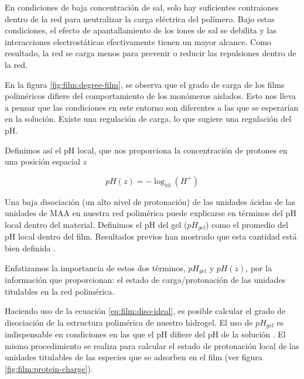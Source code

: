 En condiciones de baja concentraci\'on de sal, solo hay suficientes contraiones dentro de la red para neutralizar la carga el\'ectrica del pol\'imero. Bajo estas condiciones, el efecto de apantallamiento de los iones de sal se debilita y las interacciones electrost\'aticas efectivamente tienen un mayor alcance. Como resultado, la red se carga menos para prevenir o reducir las repulsiones dentro de la red.

En la figura \ref{fig:film:degree-film}, se observa que el grado de carga de los films polim\'ericos difiere del comportamiento de los mon\'omeros aislados. Esto nos lleva a pensar que las condiciones en este entorno son diferentes a las que se esperar\'ian en la soluci\'on. Existe una regulaci\'on de carga, lo que sugiere una regulaci\'on del pH.

Definimos as\'i el pH local, que nos proporciona la concentración de protones en una posición espacial $z$

\begin{equation}
	pH(z) = -\log_{10}(H^+)
	\label{eq:film:pH-local}
\end{equation}

Una baja disociaci\'on (un alto nivel de protonaci\'on) de las unidades \'acidas de las unidades de MAA en nuestra red polim\'erica puede explicarse en t\'erminos del pH local dentro del material. Definimos el pH del gel ($pH_{gel}$) como el promedio del pH local dentro del film. Resultados previos han mostrado que esta cantidad est\'a bien definida \addcite.

Enfatizamos la importancia de estos dos t\'erminos, $pH_{gel}$ y $pH(z)$, por la informaci\'on que proporcionan: el estado de carga/protonaci\'on de las unidades titulables en la red polim\'erica.

Haciendo uso de la ecuaci\'on \ref{eq:film:diso-ideal}, es posible calcular el grado de disociaci\'on de la estructura polim\'erica de nuestro hidrogel. El uso de $pH_{gel}$ es indispensable en condiciones en las que el pH difiere del pH de la soluci\'on \addcite. El mismo procedimiento se realiza para calcular el estado de protonaci\'on local de las unidades titulables de las especies que se adsorben en el film (ver figura \ref{fig:film:protein-charge}).


